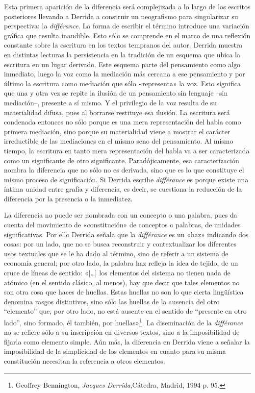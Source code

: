 Esta primera aparición de la diferencia será complejizada a lo largo de los escritos posteriores llevando a Derrida a construir un neografismo para singularizar su perspectiva: la \emph{différance}. La forma de escribir el término introduce una variación gráfica que resulta inaudible. Esto sólo se comprende en el marco de una reflexión constante sobre la escritura en los textos tempranos del autor. Derrida muestra en distintas lecturas la persistencia en la tradición de un esquema que ubica la escritura en un lugar derivado. Este esquema parte del pensamiento como algo inmediato, luego la voz como la mediación más cercana a ese pensamiento y por último la escritura como mediación que sólo «representa» la voz. Esto significa que una y otra vez se repite la ilusión de un pensamiento sin lenguaje --sin mediación--, presente a sí mismo. Y el privilegio de la voz resulta de su materialidad difusa, pues al borrarse restituye esa ilusión. La escritura será condenada entonces no sólo porque es una mera representación del habla como primera mediación, sino porque su materialidad viene a mostrar el carácter irreductible de las mediaciones en el mismo seno del pensamiento. Al mismo tiempo, la escritura en tanto mera representación del habla va a ser caracterizada como un significante de otro significante. Paradójicamente, esa caracterización nombra la diferencia que no sólo no es derivada, sino que es lo que constituye el mismo proceso de significación. Si Derrida escribe \emph{différance} es porque existe una íntima unidad entre grafía y diferencia, es decir, se cuestiona la reducción de la diferencia por la presencia o la inmediatez.

La diferencia no puede ser nombrada con un concepto o una palabra, pues da cuenta del movimiento de «constitución» de conceptos o palabras, de unidades significativas. Por ello Derrida señala que la \emph{différance} es un «haz» indicando dos cosas: por un lado, que no se busca reconstruir y contextualizar los diferentes usos textuales que se le ha dado al término, sino de referir a un sistema de economía general; por otro lado, la palabra haz refleja la idea de tejido, de un cruce de líneas de sentido: «{[}\ldots{]} los elementos del sistema no tienen nada de atómico (en el sentido clásico, al menos), hay que decir que tales elementos no son otra cosa que haces de huellas. Estas huellas no son lo que cierta lingüística denomina rasgos distintivos, sino sólo las huellas de la ausencia del otro ``elemento'' que, por otro lado, no está ausente en el sentido de ``presente en otro lado'', sino formado, él también, por huellas»\footnote{Geoffrey Bennington, \emph{Jacques Derrida},Cátedra, Madrid, 1994 p. 95.}. La diseminación de la \emph{différance} no se refiere sólo a su inscripción en diversos textos, sino a la imposibilidad de fijarla como elemento simple. Aún más, la diferencia en Derrida viene a señalar la imposibilidad de la simplicidad de los elementos en cuanto para su misma constitución necesitan la referencia a otros elementos.

